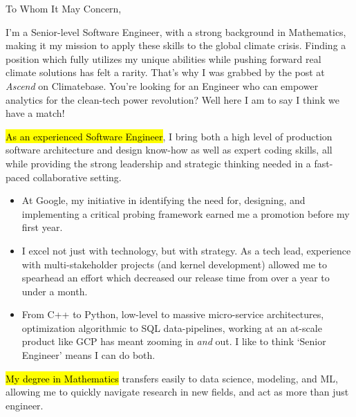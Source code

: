 \documentclass{tc_cv}
\begin{document}

\begin{adjustwidth}{40pt}{40pt}
  \large

  To Whom It May Concern, \par \bigbreak

  I'm a Senior-level Software Engineer, with a strong background in
  Mathematics, making it my mission to apply these skills to the global climate
  crisis. Finding a position which fully utilizes my unique abilities while
  pushing forward real climate solutions has felt a rarity. That's why I was
  grabbed by the post at \emph{Ascend} on Climatebase. You're looking for an
  Engineer who can empower analytics for the clean-tech power revolution? Well
  here I am to say I think we have a match! \medbreak

  \hl{As an experienced Software Engineer}, I bring both a high level of
  production software architecture and design know-how as well as expert coding
  skills, all while providing the strong leadership and strategic thinking
  needed in a fast-paced collaborative setting.
  \begin{itemize}

    \item At Google, my initiative in identifying the need for, designing, and
      implementing a critical probing framework earned me a promotion before my
      first year. %

    \item I excel not just with technology, but with strategy. As a tech lead,
      experience with multi-stakeholder projects (and kernel development)
      allowed me to spearhead an effort which decreased our release time from
      over a year to under a month.

    \item From C++ to Python, low-level to massive micro-service architectures,
      optimization algorithmic to SQL data-pipelines, working at an at-scale
      product like GCP has meant zooming in \emph{and} out. I like to think
      `Senior Engineer' means I can do both.

  \end{itemize} \medskip

  \hl{My degree in Mathematics} transfers easily to data science, modeling, and
  ML, allowing me to quickly navigate research in new fields, and act as more
  than just engineer.
  \begin{itemize}


\end{itemize}
\end{adjustwidth}
\end{document}

